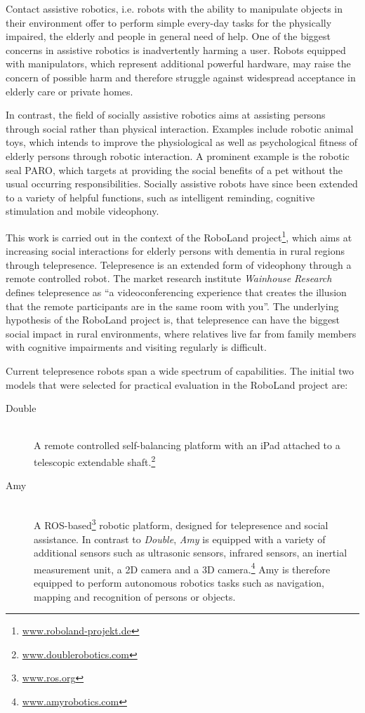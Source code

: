 Contact assistive robotics, i.e. robots with the ability to manipulate objects in their environment offer to perform simple every-day tasks for the physically impaired, the elderly and people in general need of help.
One of the biggest concerns in assistive robotics is inadvertently harming a user\cite{mataric_socially_2016}.
Robots equipped with manipulators, which represent additional powerful hardware, may raise the concern of possible harm and therefore struggle against widespread acceptance in elderly care or private homes.

In contrast, the field of socially assistive robotics aims at assisting persons through social rather than physical interaction\cite{feil-seifer_defining_2005}.
Examples include robotic animal toys, which intends to improve the physiological as well as psychological fitness of elderly persons through robotic interaction.
A prominent example is the robotic seal PARO\cite{wada_analysis_2002}, which targets at providing the social benefits of a pet without the usual occurring responsibilities.
Socially assistive robots have since been extended to a variety of helpful functions, such as intelligent reminding, cognitive stimulation and mobile videophony\cite{gross_progress_2011}.

This work is carried out in the context of the RoboLand project\footnote{\url{www.roboland-projekt.de}}, which aims at increasing social interactions for elderly persons with dementia in rural regions through telepresence.
Telepresence is an extended form of videophony through a remote controlled robot.
The market research institute \textit{Wainhouse Research} defines telepresence as ``a videoconferencing experience that creates the illusion that the remote participants are in the same room with you''\cite{davis_telepresence_2007}.
The underlying hypothesis of the RoboLand project is, that telepresence can have the biggest social impact in rural environments, where relatives live far from family members with cognitive impairments and visiting regularly is difficult.

Current telepresence robots span a wide spectrum of capabilities.
The initial two models that were selected for practical evaluation in the RoboLand project are:
\begin{description}
    \item[Double] \hfill\\
    A remote controlled self-balancing platform with an iPad attached to a telescopic extendable shaft.\footnote{\url{www.doublerobotics.com}} 
    \item[Amy] \hfill\\
    A ROS-based\footnote{\url{www.ros.org}} robotic platform, designed for telepresence and social assistance.
    In contrast to \textit{Double}, \textit{Amy} is equipped with a variety of additional sensors such as ultrasonic sensors, infrared sensors, an inertial measurement unit, a 2D camera and a 3D camera.\footnote{\url{www.amyrobotics.com}}
    Amy is therefore equipped to perform autonomous robotics tasks such as navigation, mapping and recognition of persons or objects.
\end{description}


